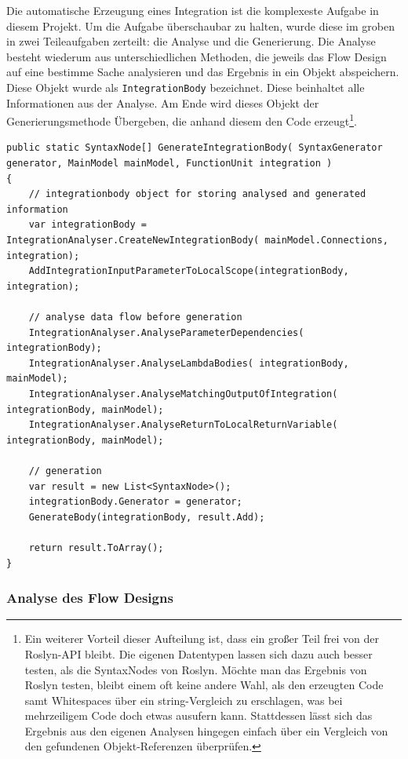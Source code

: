 	
	Die automatische Erzeugung eines Integration ist die komplexeste Aufgabe in
	diesem Projekt. Um die Aufgabe überschaubar zu halten, wurde diese im groben in
	zwei Teileaufgaben zerteilt: die Analyse und die Generierung.
	Die Analyse besteht wiederum aus unterschiedlichen Methoden, die jeweils das
	Flow Design auf eine bestimme Sache analysieren und das Ergebnis in ein Objekt
	abspeichern. Diese Objekt wurde als \texttt{IntegrationBody} bezeichnet.
	Diese beinhaltet alle Informationen aus der Analyse. Am Ende wird dieses Objekt
	der Generierungsmethode Übergeben, die anhand diesem den Code erzeugt\footnote{Ein weiterer Vorteil dieser Aufteilung ist, dass ein großer Teil frei von der Roslyn-API bleibt. Die eigenen Datentypen lassen sich dazu auch besser testen, als die SyntaxNodes von Roslyn. Möchte man das Ergebnis von Roslyn testen, bleibt einem  oft keine andere Wahl, als den erzeugten Code samt Whitespaces über ein string-Vergleich zu erschlagen, was bei mehrzeiligem Code doch etwas ausufern kann. Stattdessen lässt sich das Ergebnis aus den eigenen Analysen hingegen einfach über ein Vergleich von den gefundenen Objekt-Referenzen überprüfen.}.
	
	\begin{lstlisting}[caption=GenerateIntegrationBody Methode]
public static SyntaxNode[] GenerateIntegrationBody( SyntaxGenerator generator, MainModel mainModel, FunctionUnit integration )
{
	// integrationbody object for storing analysed and generated information
	var integrationBody = IntegrationAnalyser.CreateNewIntegrationBody( mainModel.Connections, integration);
	AddIntegrationInputParameterToLocalScope(integrationBody, integration);
	
	// analyse data flow before generation 
	IntegrationAnalyser.AnalyseParameterDependencies( integrationBody);
	IntegrationAnalyser.AnalyseLambdaBodies( integrationBody, mainModel);
	IntegrationAnalyser.AnalyseMatchingOutputOfIntegration( integrationBody, mainModel);
	IntegrationAnalyser.AnalyseReturnToLocalReturnVariable( integrationBody, mainModel);
	
	// generation
	var result = new List<SyntaxNode>();
	integrationBody.Generator = generator;
	GenerateBody(integrationBody, result.Add);
	
	return result.ToArray();
}
	\end{lstlisting}
	
	\subsubsection{Analyse des Flow Designs}

